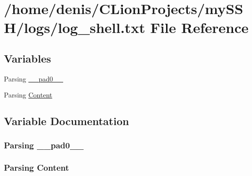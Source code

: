 \hypertarget{log__shell_8txt}{}\section{/home/denis/\+C\+Lion\+Projects/my\+S\+S\+H/logs/log\+\_\+shell.txt File Reference}
\label{log__shell_8txt}
\subsection*{Variables}
\begin{DoxyCompactItemize}
\item 
Parsing \hyperlink{log__shell_8txt_a42f114efbb55ed2b766c27adf0ce09b3}{\+\_\+\+\_\+pad0\+\_\+\+\_\+}
\item 
Parsing \hyperlink{log__shell_8txt_aef9a9a7acd1eb785277ec867850fabe5}{Content}
\end{DoxyCompactItemize}


\subsection{Variable Documentation}
\subsubsection[{\texorpdfstring{\+\_\+\+\_\+pad0\+\_\+\+\_\+}{__pad0__}}]{\setlength{\rightskip}{0pt plus 5cm}Parsing \+\_\+\+\_\+pad0\+\_\+\+\_\+}\hypertarget{log__shell_8txt_a42f114efbb55ed2b766c27adf0ce09b3}{}\label{log__shell_8txt_a42f114efbb55ed2b766c27adf0ce09b3}
\subsubsection[{\texorpdfstring{Content}{Content}}]{\setlength{\rightskip}{0pt plus 5cm}Parsing Content}\hypertarget{log__shell_8txt_aef9a9a7acd1eb785277ec867850fabe5}{}\label{log__shell_8txt_aef9a9a7acd1eb785277ec867850fabe5}
